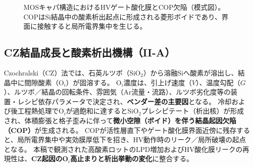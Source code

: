 \documentclass[twocolumn]{ieeetran}
\begin{document}
\begin{figure}[t]
  \centering
  \caption{MOSキャパ構造におけるHVゲート酸化膜とCOP欠陥（模式図）。%
COPはSi結晶中の酸素析出起点に形成される菱形ボイドであり、界面に接触すると局所電界集中を生じる。}
  \label{fig:moscap_cop_diamond}
\end{figure}

\subsection{CZ結晶成長と酸素析出機構（II-A）}\label{sec:CZ}
Czochralski（CZ）法では、石英ルツボ（SiO$_2$）から溶融Siへ酸素が溶出し、結晶中に間隙酸素（O$_i$）が固溶する。
O$_i$濃度は、引上げ速度（$V$）、温度勾配（$G$）、ルツボ／結晶の回転条件、雰囲気（Ar流量・流路）、ルツボ劣化度等の装置・レシピ依存パラメータで決定され、\textbf{ベンダー差の主要因}となる。
冷却および後工程熱処理でO$_i$が過飽和に達するとSiO$_2$プレシピテート（析出核）が形成され、体積膨張と格子歪みに伴って\textbf{微小空隙（ボイド）を伴う結晶起因欠陥（COP）}が生成される。
COPが活性層直下やゲート酸化膜界面近傍に残存すると、局所電界集中や実効膜厚低下を招き、HV動作時のリーク／局所破壊の起点となる。
本稿で観測された高酸素ロットのLPD増加およびHV酸化膜リークの再現性は、\textbf{CZ起因のO$_i$高止まりと析出挙動の変化}に整合する。
\end{document}

